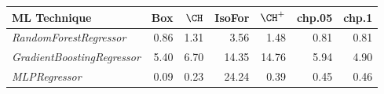 \begin{table}[ht]
\centering
\begin{tabular}{lrrrrrr}
  \hline
ML Technique & {\sc Box} & $\CH$ & {\sc IsoFor} & $\CH^+$ & chp.05 & chp.1 \\ 
  \hline
{\em RandomForestRegressor} & 0.86 & 1.31 & 3.56 & 1.48 & 0.81 & 0.81 \\ 
  {\em GradientBoostingRegressor} & 5.40 & 6.70 & 14.35 & 14.76 & 5.94 & 4.90 \\ 
  {\em MLPRegressor} & 0.09 & 0.23 & 24.24 & 0.39 & 0.45 & 0.46 \\ 
   \hline
\end{tabular}
\end{table}
